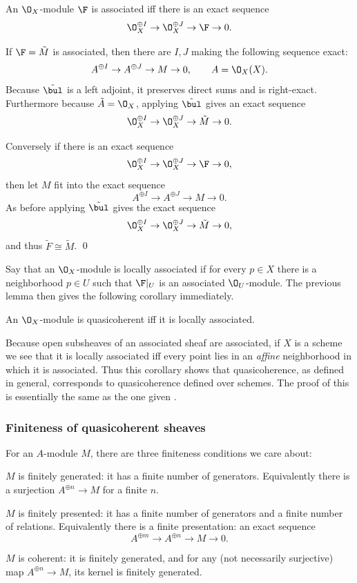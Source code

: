 \eproof

\blemm

    An $\O_X$-module $\F$ is associated iff there is an exact sequence
    $$ \O_X^{\oplus I} \to \O_X^{\oplus J} \to \F \to 0 . $$

\elemm

\bproof

    If $\F=\tilde M$ is associated, then there are $I,J$ making the following sequence exact:
    $$ A^{\oplus I} \to A^{\oplus J} \to M \to 0 ,\qquad A=\O_X(X) . $$
    Because $\tilde\bul$ is a left adjoint, it preserves direct sums and is right-exact.
    Furthermore because $\tilde A=\O_X$, applying $\tilde\bul$ gives an exact sequence
    $$ \O_X^{\oplus I} \to \O_X^{\oplus J} \to \tilde M \to 0 . $$

    Conversely if there is an exact sequence
    $$ \O_X^{\oplus I} \to \O_X^{\oplus J} \to \F \to 0 , $$
    then let $M$ fit into the exact sequence
    $$ A^{\oplus I} \to A^{\oplus J} \to M \to 0 . $$
    As before applying $\tilde\bul$ gives the exact sequence
    $$ \O_X^{\oplus I} \to \O_X^{\oplus J} \to \tilde M \to 0 , $$
    and thus $\tilde F\cong\tilde M$.
    \qed

\eproof

Say that an $\O_X$-module is {\emphcolor locally associated} if for every $p\in X$ there is a neighborhood $p\in U$ such that $\F|_U$ is an associated $\O_U$-module.
The previous lemma then gives the following corollary immediately.

\bcoro

    An $\O_X$-module is quasicoherent iff it is locally associated.

\ecoro

Because open subsheaves of an associated sheaf are associated, if $X$ is a scheme we see that it is locally associated iff every point lies in an {\it affine\/} neighborhood
in which it is associated.
Thus this corollary shows that quasicoherence, as defined in general, corresponds to quasicoherence defined over schemes.
The proof of this is essentially the same as the one given .

\subsubsection{Finiteness of quasicoherent sheaves}

For an $A$-module $M$, there are three finiteness conditions we care about:
\benum
    \item $M$ is {\emphcolor finitely generated}: it has a finite number of generators.
    Equivalently there is a surjection $A^{\oplus n}\to M$ for a finite $n$.
    \item $M$ is {\emphcolor finitely presented}: it has a finite number of generators and a finite number of relations.
    Equivalently there is a {\emphcolor finite presentation}: an exact sequence
    $$ A^{\oplus m} \to A^{\oplus n} \to M \to 0 . $$
    \item $M$ is {\emphcolor coherent}: it is finitely generated, and for any (not necessarily surjective) map $A^{\oplus n}\to M$, its kernel is finitely generated.
\eenum

